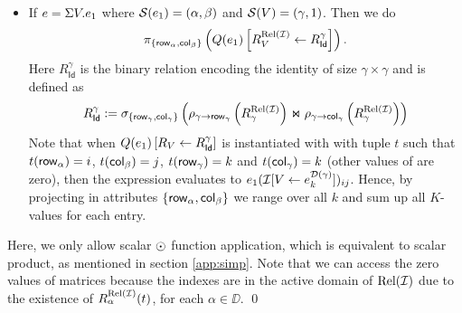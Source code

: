 \begin{itemize}
  \item If $e=\Sigma V. e_1$ where $\mathcal{S}(e_1)=(\alpha,\beta)$ and $\mathcal{S}(V)=(\gamma,1)$. Then we do 
  $$
  \pi_{\lbrace \mathsf{row}_{\alpha}, \mathsf{col}_{\beta} \rbrace}\left( Q (e_1)\left[ R_{V}^{\text{Rel}(\mathcal{I})}\leftarrow R_{\mathsf{Id}}^{\gamma} \right] \right).
  $$
  Here $R_{\mathsf{Id}}^{\gamma}$ is the binary relation encoding the identity of size $\gamma\times\gamma$ and
  is defined as 
  $$
  R_{\mathsf{Id}}^{\gamma}:= \sigma_{\lbrace \mathsf{row}_{\gamma},\mathsf{col}_{\gamma} \rbrace }\left( \rho_{\gamma\rightarrow\mathsf{row}_\gamma}\left( R_\gamma^{\text{Rel}(\mathcal{I})} \right) \Join \rho_{\gamma\rightarrow\mathsf{col}_\gamma}\left( R_\gamma^{\text{Rel}(\mathcal{I})} \right)\right)
  $$
  Note that when $Q (e_1)\left[ R_{V}\leftarrow R_{\mathsf{Id}}^{\gamma} \right]$ is instantiated with with tuple $t$ such that $t(\mathsf{row}_\alpha)=i$, $t(\mathsf{col}_\beta)=j$, 
  $t(\mathsf{row}_\gamma)=k$ and $t(\mathsf{col}_\gamma)=k$ (other values of are zero),
  then the expression evaluates to $e_1(\mathcal{I} [V\leftarrow e_{k}^{\mathcal{D}(\gamma)}])_{ij}$. 
  Hence, by projecting in attributes $\lbrace \mathsf{row}_\alpha, \mathsf{col}_\beta\rbrace$ we range over all $k$ and sum up all $K$-values for each entry.
\end{itemize}

Here, we only allow scalar $\odot$ function application, 
which is equivalent to scalar product, as mentioned in section \ref{app:simp}.
Note that we can access the zero values of matrices because the indexes are in the active domain of $\text{Rel}(\mathcal{I})$ due to the existence of $R_\alpha^{\text{Rel}(\mathcal{I})}(t)$, for each $\alpha \in \DD$.
\qed


